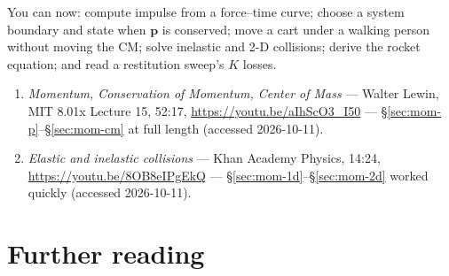 \begin{wins}
You can now: compute impulse from a force--time curve; choose a system
boundary and state when $\mathbf p$ is conserved; move a cart under a
walking person without moving the CM; solve inelastic and 2-D collisions;
derive the rocket equation; and read a restitution sweep's $K$ losses.
\end{wins}


\begin{rulebox}
\begin{enumerate}
\item \emph{Momentum, Conservation of Momentum, Center of Mass} --- Walter
Lewin, MIT 8.01x Lecture 15, 52:17, \url{https://youtu.be/aIhScO3_I50} ---
\S\ref{sec:mom-p}--\S\ref{sec:mom-cm} at full length (accessed 2026-10-11).
\item \emph{Elastic and inelastic collisions} --- Khan Academy Physics,
14:24, \url{https://youtu.be/8OB8eIPgEkQ} ---
\S\ref{sec:mom-1d}--\S\ref{sec:mom-2d} worked quickly (accessed 2026-10-11).
\end{enumerate}
\end{rulebox}

\section*{Further reading}

